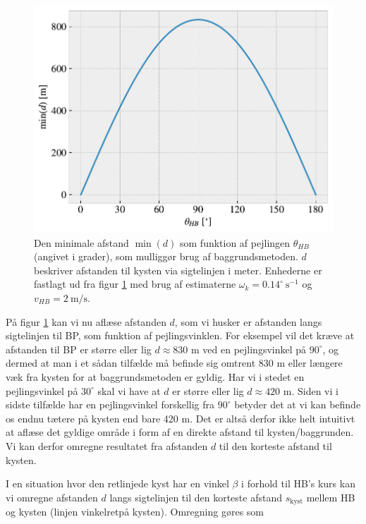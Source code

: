 \documentclass[%
 reprint,
nofootinbib,
aps,
]{revtex4-1}
\begin{document}
\begin{figure}[H]
  \includegraphics[width=\linewidth]{figures/limit_dimension.pdf}
  \caption{Den minimale afstand $\min{(d)}$ som funktion af pejlingen $\theta_{HB}$ (angivet i grader), som mulliggør brug af baggrundsmetoden. $d$ beskriver afstanden til kysten via sigtelinjen i meter. Enhederne er fastlagt ud fra figur \ref{fig:limit_dimension} med brug af estimaterne $\omega_k = 0.14^{\circ}\ \text{s}^{-1}$ og $v_{HB} = 2 \ \text{m/s}$.}
  \label{fig:limit_dimension}
\end{figure}
På figur \ref{fig:limit_dimension} kan vi nu aflæse afstanden $d$, som vi husker er afstanden langs sigtelinjen til BP, som funktion af pejlingsvinklen. For eksempel vil det kræve at afstanden til BP er større eller lig $d\approx 830$ m ved en pejlingsvinkel på $90 ^{\circ}$, og dermed at man i et sådan tilfælde må befinde sig omtrent $830$ m eller længere væk fra kysten for at baggrundsmetoden er gyldig. Har vi i stedet en pejlingsvinkel på $30 ^{\circ}$ skal vi have at $d$ er større eller lig  $d\approx 420$ m. Siden vi i sidste tilfælde har en pejlingsvinkel forskellig fra $90 ^{\circ}$ betyder det at vi kan befinde os endnu tætere på kysten end bare 420 m. Det er altså derfor ikke helt intuitivt at aflæse det gyldige område i form af en direkte afstand til kysten/baggrunden. Vi kan derfor omregne resultatet fra afstanden $d$ til den korteste afstand til kysten. \par
I en situation hvor den retlinjede kyst har en vinkel $\beta$ i forhold til HB's kurs kan vi omregne afstanden $d$ langs sigtelinjen til den korteste afstand $s_{\text{kyst}}$ mellem HB og kysten (linjen vinkelretpå kysten). Omregning gøres som
\end{document}
